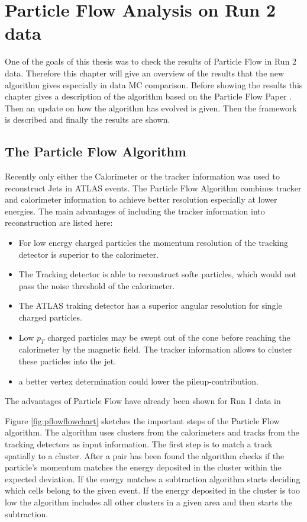 \chapter{Particle Flow Analysis on Run 2 data}

One of the goals of this thesis was to check the results of Particle Flow in Run 2 data. Therefore this chapter will give an overview of the results that the new algorithm gives especially in data MC comparison. Before showing the results this chapter gives a description of the algorithm based on the Particle Flow Paper \cite{pflow16}. Then an update on how the algorithm has evolved is given. Then the framework is described and finally the results are shown.

\section{The Particle Flow Algorithm}

Recently only either the Calorimeter or the tracker information was used to reconstruct Jets in ATLAS events. The Particle Flow Algorithm combines tracker and calorimeter information to achieve better resolution especially at lower energies. The main advantages of including the tracker information into reconstruction are listed here:


\begin{itemize}
\item For low energy charged particles the momentum resolution of the tracking detector is superior to the calorimeter.
\item The Tracking detector is able to reconstruct softe particles, which would not pass the noise threshold of the calorimeter.
\item The ATLAS traking detector has a superior angular resolution for single charged particles.
\item Low $p_T$ charged particles may be swept out of the cone before reaching the calorimeter by the magnetic field. The tracker information allows to cluster these particles into the jet.
\item a better vertex determination could lower the pileup-contribution.
\end{itemize}

The advantages of Particle Flow have already been shown for Run 1 data in

Figure \ref{fig:pflowflowchart} sketches the important steps of the Particle Flow algorithm. The algorithm uses clusters from the calorimeters and tracks from the tracking detectors as input information. The first step is to match a track spatially to a cluster. After a pair has been found the algorithm checks if the particle's momentum matches the energy deposited in the cluster within the expected deviation. If the energy matches a subtraction algorithm starts deciding which cells belong to the given event. If the energy deposited in the cluster is too low the algorithm includes all other clusters in a given area and then starts the subtraction.


